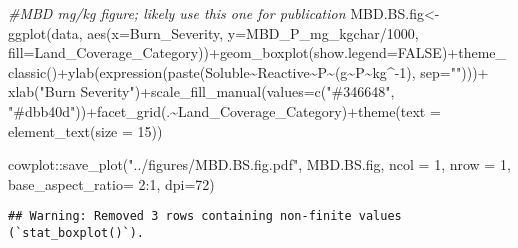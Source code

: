\documentclass[
]{article}
\newenvironment{Shaded}{\begin{snugshade}}{\end{snugshade}}
\newcommand{\AttributeTok}[1]{\textcolor[rgb]{0.77,0.63,0.00}{#1}}
\newcommand{\CommentTok}[1]{\textcolor[rgb]{0.56,0.35,0.01}{\textit{#1}}}
\newcommand{\ConstantTok}[1]{\textcolor[rgb]{0.00,0.00,0.00}{#1}}
\newcommand{\DecValTok}[1]{\textcolor[rgb]{0.00,0.00,0.81}{#1}}
\newcommand{\FunctionTok}[1]{\textcolor[rgb]{0.00,0.00,0.00}{#1}}
\newcommand{\NormalTok}[1]{#1}
\newcommand{\OtherTok}[1]{\textcolor[rgb]{0.56,0.35,0.01}{#1}}
\newcommand{\SpecialCharTok}[1]{\textcolor[rgb]{0.00,0.00,0.00}{#1}}
\newcommand{\StringTok}[1]{\textcolor[rgb]{0.31,0.60,0.02}{#1}}
\begin{document}
\begin{Shaded}
\begin{Highlighting}[]
\CommentTok{\#MBD mg/kg figure; likely use this one for publication}
\NormalTok{MBD.BS.fig}\OtherTok{\textless{}{-}}\FunctionTok{ggplot}\NormalTok{(data, }\FunctionTok{aes}\NormalTok{(}\AttributeTok{x=}\NormalTok{Burn\_Severity, }\AttributeTok{y=}\NormalTok{MBD\_P\_mg\_kgchar}\SpecialCharTok{/}\DecValTok{1000}\NormalTok{, }\AttributeTok{fill=}\NormalTok{Land\_Coverage\_Category))}\SpecialCharTok{+}\FunctionTok{geom\_boxplot}\NormalTok{(}\AttributeTok{show.legend=}\ConstantTok{FALSE}\NormalTok{)}\SpecialCharTok{+}\FunctionTok{theme\_classic}\NormalTok{()}\SpecialCharTok{+}\FunctionTok{ylab}\NormalTok{(}\FunctionTok{expression}\NormalTok{(}\FunctionTok{paste}\NormalTok{(Soluble}\SpecialCharTok{\textasciitilde{}}\NormalTok{Reactive}\SpecialCharTok{\textasciitilde{}}\NormalTok{P}\SpecialCharTok{\textasciitilde{}}\NormalTok{(g}\SpecialCharTok{\textasciitilde{}}\NormalTok{P}\SpecialCharTok{\textasciitilde{}}\NormalTok{kg}\SpecialCharTok{\^{}{-}}\DecValTok{1}\NormalTok{), }\AttributeTok{sep=}\StringTok{""}\NormalTok{)))}\SpecialCharTok{+} \FunctionTok{xlab}\NormalTok{(}\StringTok{"Burn Severity"}\NormalTok{)}\SpecialCharTok{+}\FunctionTok{scale\_fill\_manual}\NormalTok{(}\AttributeTok{values=}\FunctionTok{c}\NormalTok{(}\StringTok{"\#346648"}\NormalTok{, }\StringTok{"\#dbb40d"}\NormalTok{))}\SpecialCharTok{+}\FunctionTok{facet\_grid}\NormalTok{(.}\SpecialCharTok{\textasciitilde{}}\NormalTok{Land\_Coverage\_Category)}\SpecialCharTok{+}\FunctionTok{theme}\NormalTok{(}\AttributeTok{text =} \FunctionTok{element\_text}\NormalTok{(}\AttributeTok{size =} \DecValTok{15}\NormalTok{))}

\NormalTok{cowplot}\SpecialCharTok{::}\FunctionTok{save\_plot}\NormalTok{(}\StringTok{"../figures/MBD.BS.fig.pdf"}\NormalTok{, MBD.BS.fig, }\AttributeTok{ncol =} \DecValTok{1}\NormalTok{, }\AttributeTok{nrow =} \DecValTok{1}\NormalTok{, }\AttributeTok{base\_aspect\_ratio=} \DecValTok{2}\SpecialCharTok{:}\DecValTok{1}\NormalTok{, }\AttributeTok{dpi=}\DecValTok{72}\NormalTok{)}
\end{Highlighting}
\end{Shaded}

\begin{verbatim}
## Warning: Removed 3 rows containing non-finite values (`stat_boxplot()`).
\end{verbatim}
\end{document}
